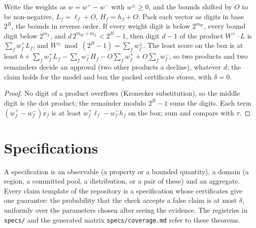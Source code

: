 \begin{theorem}\label{thm:linear_packed}
\leanok
{}
Write the weights as $w = w^+ - w^-$ with $w^\pm \ge 0$, and the bounds shifted by $O$ to be
non-negative, $L_f = \ell_f + O$, $H_f = h_f + O$. Pack each vector as digits in base $2^B$, the
bounds in reverse order. If every weight digit is below $2^{m_W}$, every bound digit below $2^{m_L}$,
and $d\,2^{m_W + m_L} < 2^B - 1$, then digit $d-1$ of the product $W^+ \cdot L$ is
$\sum_f w^+_f L_f$, and $W^\pm \bmod (2^B - 1) = \sum_f w^\pm_f$. The least score on the box is at
least $b + \sum_f w^+_f L_f - \sum_f w^-_f H_f - O \sum_f w^+_f + O \sum_f w^-_f$, so two products and
two remainders decide an approval (two other products a decline), whatever $d$; the claim holds for the model and box the packed
certificate stores, with $\delta = 0$.
\end{theorem}
\begin{proof}
\leanok
No digit of a product overflows (Kronecker substitution), so the middle digit is the dot product;
the remainder modulo $2^B - 1$ sums the digits. Each term $(w^+_f - w^-_f) x_f$ is at least
$w^+_f \ell_f - w^-_f h_f$ on the box; sum and compare with $\tau$.
\end{proof}

\chapter{Specifications}

A specification is an observable (a property or a bounded quantity), a domain (a region, a
committed pool, a distribution, or a pair of these) and an aggregate. Every claim template of the repository is a specification whose
certificates give one guarantee: the probability that the check accepts a false claim is at most
$\delta$, uniformly over the parameters chosen after seeing the evidence. The registries in
\texttt{specs/} and the generated matrix \texttt{specs/coverage.md} refer to these theorems.

